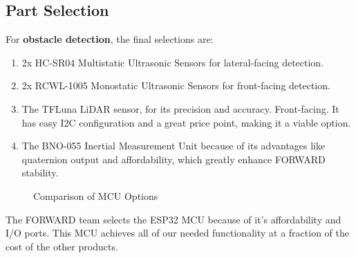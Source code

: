 \subsection{Part Selection}
\noindent For \textbf{obstacle detection}, the final selections are:
\begin{enumerate}
	\item 2x HC-SR04 Multistatic Ultrasonic Sensors for lateral-facing detection.
	\item 2x RCWL-1005 Monostatic Ultrasonic Sensors for front-facing detection.
	\item The TFLuna LiDAR sensor, for its precision and accuracy. Front-facing. It has easy I2C configuration and a great price point, making it a viable option.
	\item The BNO-055 Inertial Measurement Unit because of its advantages like quaternion output and affordability, which greatly enhance FORWARD stability.
\end{enumerate}

\begin{figure}[H]
	\centering
	\setlength{\tabcolsep}{5pt} %
	\renewcommand{\arraystretch}{1.75} %
	\caption{\label{fig:mcuComparison}Comparison of MCU Options}
\end{figure}

\noindent The FORWARD team selects the ESP32 MCU because of it's affordability and I/O ports. This MCU achieves all of our needed functionality at a fraction of the cost of the other products. \\

